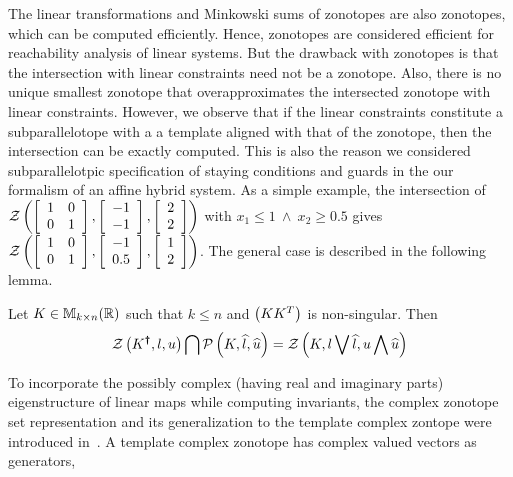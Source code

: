 The linear transformations and Minkowski sums of zonotopes are also
zonotopes, which can be computed efficiently.  Hence, zonotopes are
considered efficient for reachability analysis of linear systems.  But
the drawback with zonotopes is that the intersection with linear
constraints need not be a zonotope.  Also, there is no unique smallest
zonotope that overapproximates the intersected zonotope with linear
constraints.  However, we observe that if the linear constraints
constitute a subparallelotope with a a template aligned with that of
the zonotope, then the intersection can be exactly computed.  This is
also the reason we considered subparallelotpic
specification of staying conditions and guards in the our formalism of
an affine hybrid system.  As a simple example, the intersection of
$\mathcal{Z}\left(\left[\begin{array}{l l}1 & 0 \\ 0 &
      1\end{array}\right],\left[\begin{array}{c}-1\\ -1\end{array}\right],\left[\begin{array}{c}2\\ 2\end{array}\right]\right)$
with $x_1\leq 1~\wedge~x_2\geq 0.5$ gives $\mathcal{Z}\left(\left[\begin{array}{l
        l}1 & 0 \\ 0 &
      1\end{array}\right],\left[\begin{array}{c}-1\\ 0.5\end{array}\right],\left[\begin{array}{c}1\\ 2\end{array}\right]\right)$.
The general case is described in the following lemma.
%
\begin{lemma}\label{lem:motivation}
Let $K\in\mathbb{M}_{k\times n}(\mathbb{R})$ such that $k\leq n$ and $\left(KK^T\right)$ is
non-singular.  Then
\[
\mathcal{Z}\left(K^{\bm{\dagger}},l,u\right) \bigcap \mathcal{P}\left(K,\widehat{l},\widehat{u}\right)
= \mathcal{Z}\left(K,l\bigvee \widehat{l},u\bigwedge \widehat{u}\right)
\]
\end{lemma}
%
To incorporate the possibly complex (having real and imaginary parts)
eigenstructure of linear maps while computing invariants, the complex
zonotope set representation and its generalization to the template
complex zontope were introduced in~\cite{adimoolam2016using,tcz2017}.
A template complex zonotope has complex valued vectors as generators,

